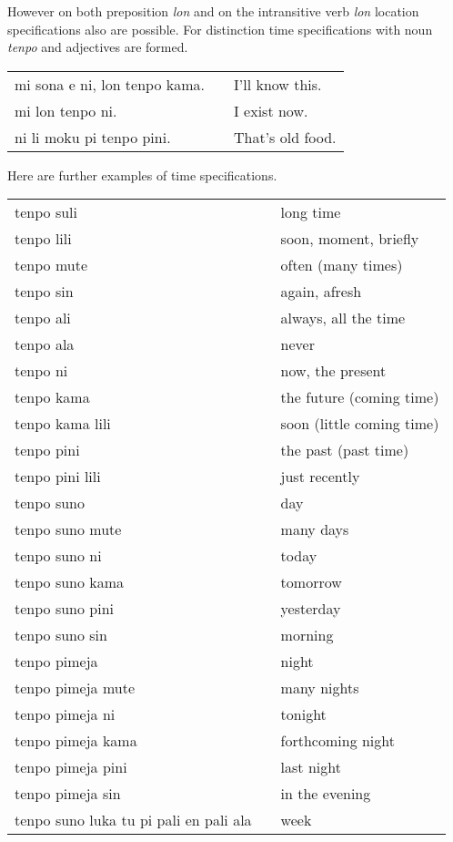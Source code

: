 However on both preposition \textit{lon} and on the intransitive verb \textit{lon} location specifications also are possible.
For distinction time specifications with noun \textit{tenpo} and adjectives are formed. 

\begin{supertabular}{p{5,5cm}|ll}
mi sona e ni, lon tenpo kama. && I'll know this. \\
mi lon tenpo ni. && I exist now. \\
ni li moku pi tenpo pini. && That's old food. \\
\end{supertabular}

Here are further examples of time specifications.

\begin{supertabular}{p{5,5cm}|ll}
tenpo suli && long time \\
tenpo lili && soon, moment, briefly \\ 
tenpo mute && often (many times) \\
tenpo sin && again, afresh  \\
tenpo ali && always, all the time \\
tenpo ala && never \\
%
tenpo ni && now, the present \\
tenpo kama && the future (coming time) \\
tenpo kama lili && soon (little coming time) \\
tenpo pini && the past (past time) \\
tenpo pini lili && just recently \\
%
tenpo suno && day \\
tenpo suno mute && many days \\
tenpo suno ni && today  \\
tenpo suno kama && tomorrow  \\
tenpo suno pini && yesterday  \\
tenpo suno sin && morning \\
%
tenpo pimeja && night \\
tenpo pimeja mute && many nights \\
tenpo pimeja ni && tonight  \\
tenpo pimeja kama && forthcoming night \\
tenpo pimeja pini && last night \\
tenpo pimeja sin && in the evening \\
%
tenpo suno luka tu pi pali en pali ala && week \\

\end{supertabular}
